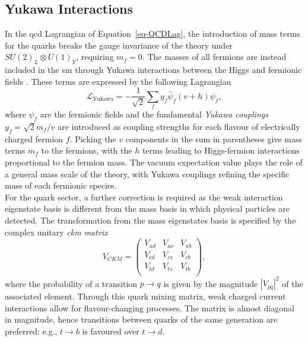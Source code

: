 \subsection{Yukawa Interactions}\label{subset-yukint}
In the \gls{qcd} Lagrangian of Equation~\ref{eq-QCDLag}, the introduction of mass terms for the quarks breaks the gauge invariance of the theory under $SU(2)_L \otimes U(1)_Y$, requiring $m_f = 0$. The masses of all fermions are instead included in the \gls{sm} through Yukawa interactions between the Higgs and fermionic fields \cite{10.1143/PTPS.1.1}. These terms are expressed by the following Lagrangian
\begin{equation}\label{eq-YukLag}
    \mathcal{L}_{\text{Yukawa}} = - \frac{1}{\sqrt{2}} \sum_{f} 
    y_f \bar{\psi}_f (v + h) \psi_f,
\end{equation}
where $\psi_f$ are the fermionic fields and the fundamental \textit{Yukawa couplings} $y_f = \sqrt{2}m_f/v$ are introduced as coupling strengths for each flavour of electrically charged fermion $f$. Picking the $v$ components in the sum in parentheses give mass terms $m_f$ to the fermions, with the $h$ terms leading to Higgs-fermion interactions proportional to the fermion mass. The vacuum expectation value plays the role of a general mass scale of the theory, with Yukawa couplings refining the specific mass of each fermionic species. \\

For the quark sector, a further correction is required as the weak interaction eigenstate basis is different from the mass basis in which physical particles are detected. The transformation from the mass eigenstates basis is specified by the complex unitary \textit{\gls{ckm} matrix} \cite{Tanabashi:2018oca}
\begin{equation}
    V_{CKM} = \begin{pmatrix}
            V_{ud} & V_{us} & V_{ub}\\ 
            V_{cd} & V_{cs} & V_{cb}\\ 
            V_{td} & V_{ts} & V_{tb}\\ 
        \end{pmatrix},
\end{equation}
where the probability of a transition $p \rightarrow q$ is given by the magnitude $|V_{pq}|^2$ of the associated element. Through this quark mixing matrix, weak charged current interactions allow for flavour-changing processes. The matrix is almost diagonal in magnitude, hence transitions between quarks of the same generation are preferred: e.g., $t \rightarrow b$ is favoured over $t \rightarrow d$.

